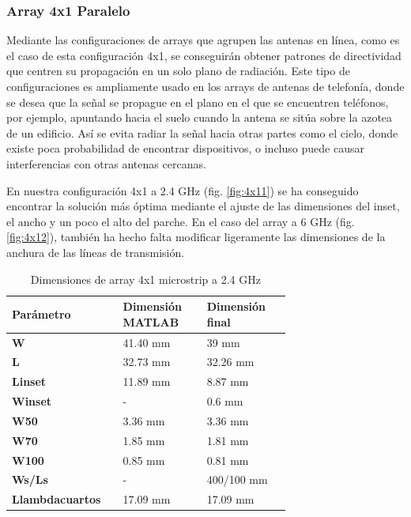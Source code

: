 \subsubsection{Array 4x1 Paralelo} 
\par Mediante las configuraciones de arrays que agrupen las antenas en línea, como es el caso de esta configuración 4x1, se conseguirán obtener patrones de directividad que centren su propagación en un solo plano de radiación. Este tipo de configuraciones es ampliamente usado en los arrays de antenas de telefonía, donde se desea que la señal se propague en el plano en el que se encuentren teléfonos, por ejemplo, apuntando hacia el suelo cuando la antena se sitúa sobre la azotea de un edificio. Así se evita radiar la señal hacia otras partes como el cielo, donde existe poca probabilidad de encontrar dispositivos, o incluso puede causar interferencias con otras antenas cercanas.
\\
\par En nuestra configuración 4x1 a 2.4 GHz (fig. \ref{fig:4x11}) se ha conseguido encontrar la solución más óptima mediante el ajuste de las dimensiones del inset, el ancho y un poco el alto del parche. En el caso del array a 6 GHz (fig. \ref{fig:4x12}), también ha hecho falta modificar ligeramente las dimensiones de la anchura de las líneas de transmisión.
\\
\begin{table}[H]

   \small %
   \centering %
   \begin{tabular}{m{0.2\linewidth}m{0.25\linewidth}m{0.25\linewidth}} %
   \toprule[\heavyrulewidth]\toprule[\heavyrulewidth]
   \textbf{Parámetro} & \textbf{Dimensión MATLAB} & \textbf{Dimensión final} \\ 
   \midrule
   \textbf{W} & 41.40 mm & 39 mm \\
   \textbf{L} & 32.73 mm & 32.26 mm\\
   \textbf{Linset} & 11.89 mm & 8.87 mm\\
   \textbf{Winset} & - & 0.6 mm\\
   \textbf{W50} & 3.36 mm & 3.36 mm\\
   \textbf{W70} & 1.85 mm & 1.81 mm\\
   \textbf{W100} & 0.85 mm & 0.81 mm\\
   \textbf{Ws/Ls} & - & 400/100 mm\\
   \textbf{Llambdacuartos} & 17.09 mm & 17.09 mm\\
   \bottomrule[\heavyrulewidth] 
   \end{tabular}
   \caption{Dimensiones de array 4x1 microstrip a 2.4 GHz} 
     
   \label{tab:array4x11}
\end{table}

